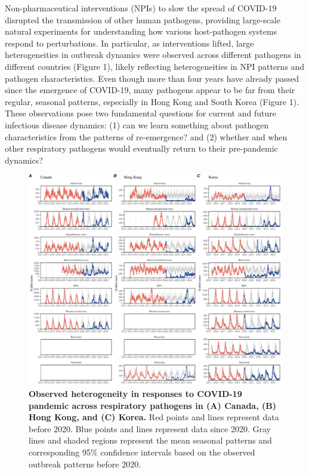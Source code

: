 \documentclass[12pt]{article}
\begin{document}
Non-pharmaceutical interventions (NPIs) to slow the spread of COVID-19 disrupted the transmission of other human pathogens, providing large-scale natural experiments for understanding how various host-pathogen systems respond to perturbations.
In particular, as interventions lifted, large heterogeneities in outbreak dynamics were observed across different pathogens in different countries (Figure 1), likely reflecting heterogeneities in NPI patterns and pathogen characteristics.
Even though more than four years have already passed since the emergence of COVID-19, many pathogens appear to be far from their regular, seasonal patterns, especially in Hong Kong and South Korea (Figure 1).
These observations pose two fundamental questions for current and future infectious disease dynamics: (1) can we learn something about pathogen characteristics from the patterns of re-emergence? and (2) whether and when other respiratory pathogens would eventually return to their pre-pandemic dynamics?

\begin{figure}[!th]
\includegraphics[width=\textwidth]{../figure1/figure1.pdf}
\caption{
\textbf{Observed heterogeneity in responses to COVID-19 pandemic across respiratory pathogens in (A) Canada, (B) Hong Kong, and (C) Korea.}
Red points and lines represent data before 2020.
Blue points and lines represent data since 2020.
Gray lines and shaded regions represent the mean seasonal patterns and corresponding 95\% confidence intervals based on the observed outbreak patterns before 2020.
}
\end{figure}
\end{document}
